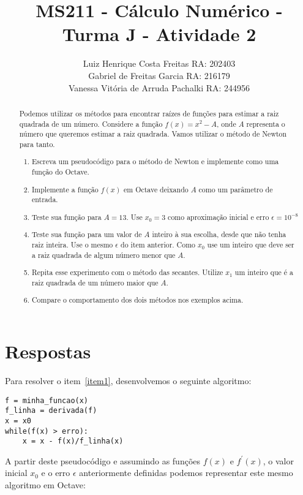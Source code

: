 \documentclass[a4paper]{article}
\title{MS211 - Cálculo Numérico - Turma J - Atividade 2
}
\author{Luiz Henrique Costa Freitas RA: 202403 \\
        Gabriel de Freitas Garcia RA: 216179 \\
        Vanessa Vitória de Arruda Pachalki RA: 244956
}
\begin{document}
\renewcommand{\abstractname}{Enunciado Atividade 2}
\maketitle

\begin{abstract}
Podemos utilizar os métodos para encontrar raízes de funções para estimar a raiz
quadrada de um número. Considere a função $f(x) = x^2 - A$, onde $A$ representa o número que queremos estimar a raiz quadrada. Vamos utilizar o método de Newton para tanto.
\begin{enumerate}
    \item Escreva um pseudocódigo para o método de Newton e implemente como uma função do Octave. \label{item1}
    \item Implemente a função $f(x)$ em Octave deixando $A$ como um parâmetro de entrada. \label{item2}
    \item Teste sua função para $A = 13$. Use $x_0 = 3$ como aproximação inicial e erro $\epsilon = 10^{-8}$\label{item3}
    \item Teste sua função para um valor de $A$ inteiro à sua escolha, desde que não tenha raiz inteira. Use o mesmo $\epsilon$ do item anterior. Como $x_0$ use um inteiro que
    deve ser a raiz quadrada de algum número menor que $A$. \label{item4}
    \item Repita esse experimento com o método das secantes. Utilize $x_1$ um inteiro que é a raiz quadrada de um número maior que $A$.\label{item5}
    \item Compare o comportamento dos dois métodos nos exemplos acima. \label{item6}
\end{enumerate}
   
\end{abstract}

\section{Respostas}

Para resolver o item~\ref{item1}, desenvolvemos o seguinte algoritmo: 
\begin{lstlisting}
f = minha_funcao(x)
f_linha = derivada(f)
x = x0
while(f(x) > erro):
	x = x - f(x)/f_linha(x)
\end{lstlisting}

A partir deste pseudocódigo e assumindo as funções $f(x)$ e $f^{'}(x)$, o valor inicial $x_0$ e o erro $\epsilon$ anteriormente definidas podemos representar este mesmo algoritmo em Octave:
\end{document}
